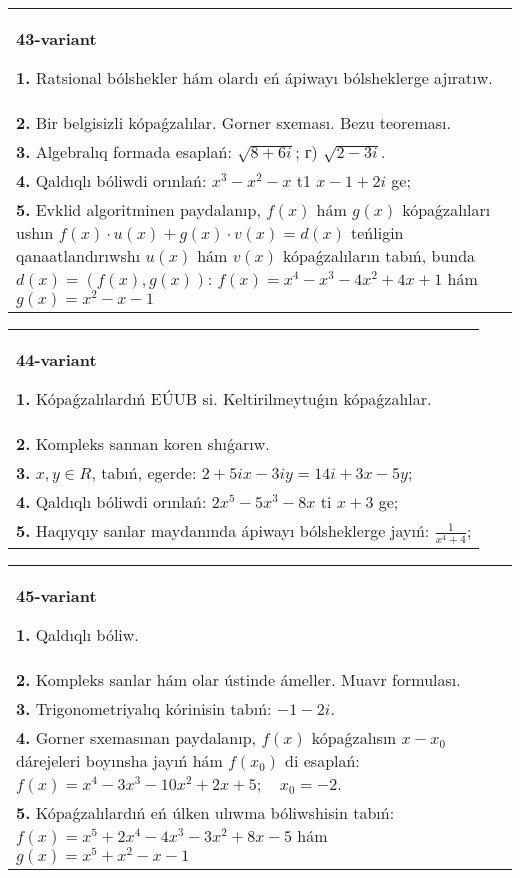 \documentclass{article}
\begin{document}
\begin{tabular}{m{17cm}}
\textbf{43-variant}
\newline

\textbf{1.} Ratsional bólshekler hám olardı eń ápiwayı bólsheklerge ajıratıw. \\
\textbf{2.} Bir belgisizli kópaǵzalılar. Gorner sxeması. Bezu teoreması.  \\
\textbf{3.} Algebralıq formada esaplań: $\sqrt{8+6 i}$; г) $\sqrt{2-3 i}$. \\
\textbf{4.} Qaldıqlı bóliwdi orınlań:  $x^3-x^2-x$ t1 $x-1+2 i$ ge; \\
\textbf{5.} Evklid algoritminen paydalanıp, $f(x)$ hám $g(x)$ kópaǵzalıları ushın $f(x) \cdot u(x)+g(x) \cdot v(x)=d(x)$ teńligin qanaatlandırıwshı $u(x)$ hám $v(x)$ kópaǵzalıların tabıń, bunda $d(x)=(f(x), g(x))$:  $f(x)=x^4-x^3-4 x^2+4 x+1$ hám $g(x)=x^2-x-1$ \\

\end{tabular}
\vspace{1cm}


\begin{tabular}{m{17cm}}
\textbf{44-variant}
\newline

\textbf{1.} Kópaǵzalılardıń EÚUB si. Keltirilmeytuǵın   kópaǵzalılar. \\
\textbf{2.} Kompleks sannan koren shıǵarıw. \\
\textbf{3.}  $x, y \in R$, tabıń, egerde: $2+5 i x-3 i y=14 i+3 x-5 y$; \\
\textbf{4.} Qaldıqlı bóliwdi orınlań: $2 x^5-5 x^3-8 x$ ti $x+3$ ge; \\
\textbf{5.} Haqıyqıy sanlar maydanında ápiwayı bólsheklerge jayıń:  $\frac{1}{x^4+4}$; \\

\end{tabular}
\vspace{1cm}


\begin{tabular}{m{17cm}}
\textbf{45-variant}
\newline

\textbf{1.} Qaldıqlı bóliw.  \\
\textbf{2.} Kompleks sanlar hám olar ústinde ámeller. Muavr formulası.  \\
\textbf{3.} Trigonometriyalıq kórinisin tabıń: $-1-2 i$. \\
\textbf{4.} Gorner sxemasınan paydalanıp, $f(x)$ kópaǵzalısın $x-x_0$ dárejeleri boyınsha jayıń hám $f\left(x_0\right)$ di esaplań: $f(x)=x^4-3 x^3-10 x^2+2 x+5 ; \quad x_0=-2$. \\
\textbf{5.} Kópaǵzalılardıń eń úlken ulıwma bóliwshisin tabıń:  $f(x)=x^5+2 x^4-4 x^3-3 x^2+8 x-5$ hám $g(x)=x^5+x^2-x-1$ \\

\end{tabular}
\vspace{1cm}
\end{document}
